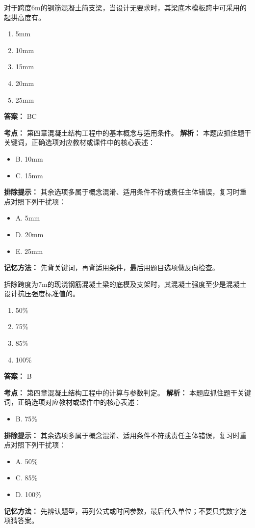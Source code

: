 \documentclass[UTF8,fontset=fandol,11pt]{ctexart}
\begin{document}
\begin{quizbox}[title={第 40 题}]
对于跨度6m的钢筋混凝土简支梁，当设计无要求时，其梁底木模板跨中可采用的起拱高度有。\\
\begin{enumerate}[label=\Alph*.]
\item 5mm
\item 10mm
\item 15mm
\item 20mm
\item 25mm
\end{enumerate}
\textbf{答案：} BC
\vspace{0.25em}
\begin{answerbox}[title={考点解析}]
\textbf{考点：} 第四章混凝土结构工程中的基本概念与适用条件。
\textbf{解析：} 本题应抓住题干关键词，正确选项对应教材或课件中的核心表述：
\begin{itemize}
\item B. 10mm
\item C. 15mm
\end{itemize}
\textbf{排除提示：} 其余选项多属于概念混淆、适用条件不符或责任主体错误，复习时重点对照下列干扰项：
\begin{itemize}
\item A. 5mm
\item D. 20mm
\item E. 25mm
\end{itemize}
\textbf{记忆方法：} 先背关键词，再背适用条件，最后用题目选项做反向检查。
\end{answerbox}
\end{quizbox}

\begin{quizbox}[title={第 41 题}]
拆除跨度为7m的现浇钢筋混凝土梁的底模及支架时，其混凝土强度至少是混凝土设计抗压强度标准值的。\\
\begin{enumerate}[label=\Alph*.]
\item 50\%
\item 75\%
\item 85\%
\item 100\%
\end{enumerate}
\textbf{答案：} B
\vspace{0.25em}
\begin{answerbox}[title={考点解析}]
\textbf{考点：} 第四章混凝土结构工程中的计算与参数判定。
\textbf{解析：} 本题应抓住题干关键词，正确选项对应教材或课件中的核心表述：
\begin{itemize}
\item B. 75\%
\end{itemize}
\textbf{排除提示：} 其余选项多属于概念混淆、适用条件不符或责任主体错误，复习时重点对照下列干扰项：
\begin{itemize}
\item A. 50\%
\item C. 85\%
\item D. 100\%
\end{itemize}
\textbf{记忆方法：} 先辨认题型，再列公式或时间参数，最后代入单位；不要只凭数字选项猜答案。
\end{answerbox}
\end{quizbox}
\end{document}
